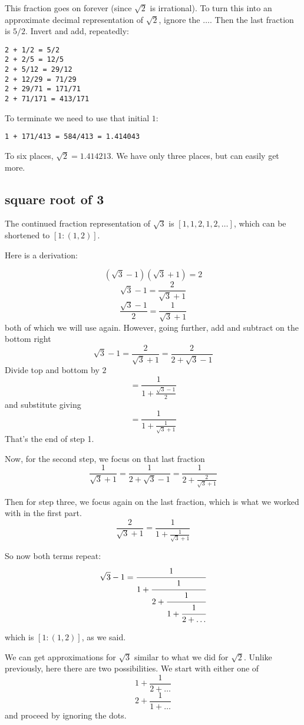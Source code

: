 \documentclass[11pt, oneside]{article}
\begin{document}
This fraction goes on forever (since $\sqrt{2}$ is irrational).  To turn this into an approximate decimal representation of $\sqrt{2}$, ignore the $\dots$.  Then the last fraction is $5/2$.  Invert and add, repeatedly:

\begin{verbatim}
2 + 1/2 = 5/2
2 + 2/5 = 12/5
2 + 5/12 = 29/12
2 + 12/29 = 71/29
2 + 29/71 = 171/71
2 + 71/171 = 413/171
\end{verbatim}

To terminate we need to use that initial $1$:
\begin{verbatim}
1 + 171/413 = 584/413 = 1.414043
\end{verbatim}

To six places, $\sqrt{2} = 1.414213$.  We have only three places, but can easily get more.

\subsection*{square root of 3}
The continued fraction representation of $\sqrt{3}$ is $[1,1,2,1,2, \dots]$, which can be shortened to $[1:(1,2)]$.  

Here is a derivation:

\[ (\sqrt{3} - 1)(\sqrt{3} + 1) = 2 \]
\[ \sqrt{3} - 1 = \frac{2}{\sqrt{3} + 1}   \]
\[ \frac{\sqrt{3} - 1}{2} = \frac{1}{\sqrt{3} + 1} \]
both of which we will use again.  However, going further, add and subtract on the bottom right
\[ \sqrt{3} - 1 = \frac{2}{\sqrt{3} + 1}  = \frac{2}{2 + \sqrt{3} - 1} \]
Divide top and bottom by $2$
\[ = \frac{1}{1 + \frac{\sqrt{3} - 1}{2}} \]
and substitute giving
\[= \frac{1}{1 + \frac{1}{\sqrt{3} +1}} \]
That's the end of step 1.

Now, for the second step, we focus on that last fraction
\[ \frac{1}{\sqrt{3} +1} = \frac{1}{2 + \sqrt{3} -1} = \frac{1}{2 + \frac{2}{\sqrt{3} + 1}} \]

Then for step three, we focus again on the last fraction, which is what we worked with in the first part.
\[ \frac{2}{\sqrt{3} + 1} = \frac{1}{1 + \frac{1}{\sqrt{3} +1}} \]

So now both terms repeat:
\[ \sqrt{3} - 1 = \cfrac{1}{1+\cfrac{1}{2+\cfrac{1}{1 + \cfrac{1}{2 + \dots }}}}  \]

which is $[1:(1,2)]$, as we said.

We can get approximations for $\sqrt{3}$ similar to what we did for $\sqrt{2}$.  Unlike previously, here there are two possibilities.  We start with either one of
\[ 1 + \frac{1}{2 + \dots} \]
\[ 2 + \frac{1}{1 + \dots} \]
and proceed by ignoring the dots.
\end{document}
